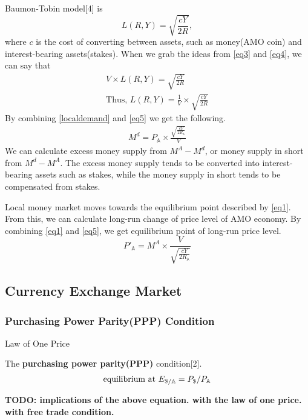 \documentclass[a4paper,11pt]{scrartcl}
\newcommand{\dd}{\text{\textdollar}}
\newcommand{\amom}{\mathbb{A}}
\begin{document}
Baumon-Tobin model[4] is
\begin{equation}
	L(R, Y) = \sqrt{\frac{cY}{2R}}, \label{eq4}
\end{equation}
where $c$ is the cost of converting between assets, such as money(AMO coin) and
interest-bearing assets(stakes).
When we grab the ideas from \eqref{eq3} and \eqref{eq4}, we can say that
\begin{eqnarray}
	V \times L(R, Y) = \sqrt{\frac{cY}{2R}} \\
	\text{Thus,\ } L(R, Y) = \frac{1}{V} \times \sqrt{\frac{cY}{2R}} \label{eq5}
\end{eqnarray}
By combining \eqref{localdemand} and \eqref{eq5} we get the following.
\begin{eqnarray}
	M^d = P_\amom \times \frac{\sqrt{\frac{cY}{2R_\amom}}}{V}
\end{eqnarray}
We can calculate excess money supply from $M^A - M^d$, or money supply in short
from $M^d - M^A$. The excess money supply tends to be converted into
interest-bearing assets such as stakes, while the money supply in short tends
to be compensated from stakes.

Local money market moves towards the equilibrium point described by
\eqref{eq1}. From this, we can calculate long-run change of price level of AMO
economy. By combining \eqref{eq1} and \eqref{eq5}, we get equilibrium point of
long-run price level.
\begin{equation}
	P'_\amom = M^A \times \frac{V}{\sqrt{\frac{cY}{2R_\amom}}}
\end{equation}

\subsection{Currency Exchange Market}

\subsubsection{Purchasing Power Parity(PPP) Condition}
Law of One Price

The \textbf{purchasing power parity(PPP)} condition[2].
\begin{eqnarray}
	\text{equilibrium at\ } E_{\dd/\amom} = P_\dd / P_\amom \label{eq:3}
\end{eqnarray}

\textbf{TODO: implications of the above equation. with the law of one price.
with free trade condition.}
\end{document}
